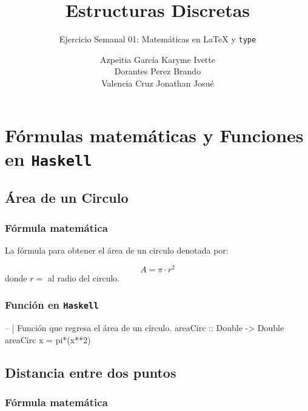 \documentclass[
]{article}
\title{Estructuras Discretas}
\subtitle{Ejercicio Semanal 01: Matemáticas en LaTeX y \texttt{type}}
\author{Azpeitia García Karyme Ivette\\
Dorantes Perez Brando\\
Valencia Cruz Jonathan Josué}
\date{}
\newenvironment{Shaded}{\begin{snugshade}}{\end{snugshade}}
\newcommand{\DecValTok}[1]{\textcolor[rgb]{0.00,0.00,0.81}{#1}}
\newcommand{\NormalTok}[1]{#1}
\begin{document}
\maketitle

\hypertarget{fuxf3rmulas-matemuxe1ticas-y-funciones-en-haskell}{%
\section{\texorpdfstring{Fórmulas matemáticas y Funciones en
\texttt{Haskell}}{Fórmulas matemáticas y Funciones en Haskell}}\label{fuxf3rmulas-matemuxe1ticas-y-funciones-en-haskell}}

\hypertarget{uxe1rea-de-un-circulo}{%
\subsection{Área de un Circulo}\label{uxe1rea-de-un-circulo}}

\hypertarget{fuxf3rmula-matemuxe1tica}{%
\subsubsection{Fórmula matemática}\label{fuxf3rmula-matemuxe1tica}}

La fórmula para obtener el área de un circulo denotada por:

\[
A= \pi \cdot r^2
\] donde \(r=\) al radio del circulo.

\hypertarget{funciuxf3n-en-haskell}{%
\subsubsection{\texorpdfstring{Función en
\texttt{Haskell}}{Función en Haskell}}\label{funciuxf3n-en-haskell}}

\begin{Shaded}
\begin{Highlighting}[]
\NormalTok{-- | Función que regresa el área de un círculo.}
\NormalTok{areaCirc :: Double -> Double}
\NormalTok{areaCirc x = pi*(x**}\DecValTok{2}\NormalTok{)}
\end{Highlighting}
\end{Shaded}

\hypertarget{distancia-entre-dos-puntos}{%
\subsection{Distancia entre dos
puntos}\label{distancia-entre-dos-puntos}}

\hypertarget{fuxf3rmula-matemuxe1tica-1}{%
\subsubsection{Fórmula matemática}\label{fuxf3rmula-matemuxe1tica-1}}
\end{document}
